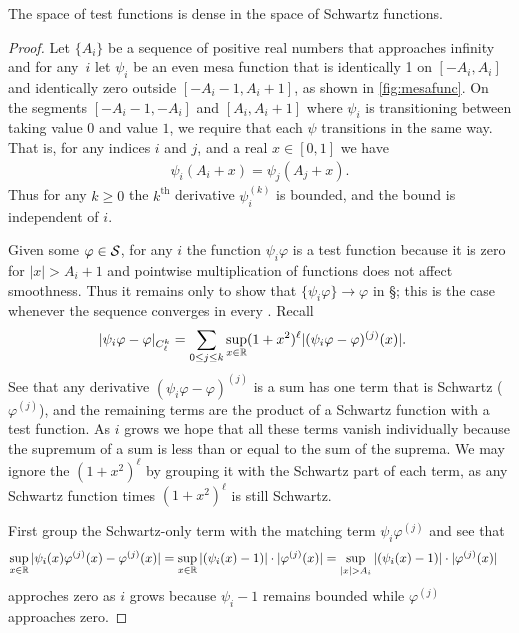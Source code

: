     \begin{lemma}
      \label{lemma:ddenseins}
      The space of test functions is dense in the space of Schwartz functions.
    \end{lemma}
    \begin{proof}
      Let $\{A_i\}$ be a sequence of positive real numbers that approaches infinity and for any~$i$ let $\psi_i$ be an even mesa function that is identically 1 on $[-A_i,A_i]$ and identically zero outside $[-A_i-1,A_i+1]$, as shown in \cref{fig:mesafunc}.
      On the segments $[-A_i-1,-A_i]$ and $[A_i,A_i+1]$ where $\psi_i$ is transitioning between taking value $0$ and value $1$, we require that each $\psi$ transitions in the same way.
      That is, for any indices $i$ and $j$, and a real $x\in[0,1]$ we have
      \begin{align*}
        \psi_i(A_i+x) = \psi_j(A_j+x) \text{.}
      \end{align*}
      Thus for any $k\ge0$ the $k^{\text{th}}$ derivative $\psi_i^{(k)}$ is bounded, and the bound is independent of $i$.

      Given some $\varphi\in\S$, for any $i$ the function $\psi_i\varphi$ is a test function because it is zero for $|x|>A_i+1$ and pointwise multiplication of functions does not affect smoothness.
      Thus it remains only to show that $\{\psi_i\varphi\}\rightarrow\varphi$ in \S; this is the case whenever the sequence converges in every \Ckl.
      Recall
      \begin{align*}
        |\psi_i\varphi - \varphi|_\Ckl
        &= \sum_{0\le j\le k} \sup_{x\in\R} (1+x^2)^\ell |(\psi_i\varphi-\varphi)^{(j)}(x)| \text{.}
      \end{align*}
      See that any derivative $(\psi_i\varphi-\varphi)^{(j)}$ is a sum has one term that is Schwartz ($\varphi^{(j)}$), and the remaining terms are the product of a Schwartz function with a test function.
      As $i$ grows we hope that all these terms vanish individually because the supremum of a sum is less than or equal to the sum of the suprema.
      We may ignore the $(1+x^2)^\ell$ by grouping it with the Schwartz part of each term, as any Schwartz function times $(1+x^2)^\ell$ is still Schwartz.

      First group the Schwartz-only term with the matching term $\psi_i\varphi^{(j)}$ and see that 
      \begin{align*}
        \sup_{x\in\R} |\psi_i(x)\varphi^{(j)}(x)-\varphi^{(j)}(x)|
        &= \sup_{x\in\R} |(\psi_i(x)-1)|\cdot|\varphi^{(j)}(x)|
        = \sup_{|x|>A_i} |(\psi_i(x)-1)|\cdot|\varphi^{(j)}(x)|
      \end{align*}
      approches zero as $i$ grows because $\psi_i-1$ remains bounded while $\varphi^{(j)}$ approaches zero.
      

\end{proof}
